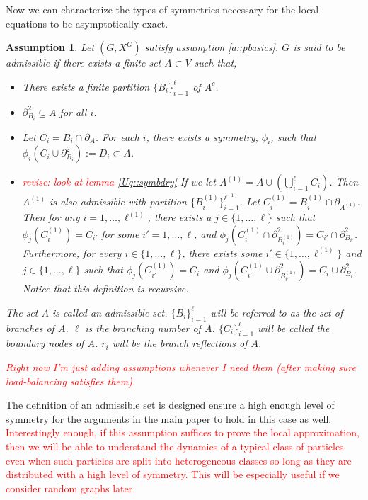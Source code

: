 \documentclass[12pt]{article}
\newcommand{\tr}{\textcolor{red}}
\newcommand{\ind}{\hspace{24pt}}
\newcommand{\defeq}{:=}								%
\newcommand{\neigh}[1]{\partial_{#1}}				%
\newcommand{\dneigh}[1]{\partial^2_{#1}}			%
\newcommand{\Xf}{X}									%
\newcommand{\gind}[1]{^{#1}}						%
\newcommand{\psize}{\ell}							%
\newtheorem{assu}[thms]{Assumption}
\begin{document}
Now we can characterize the types of symmetries necessary for the local equations to be asymptotically exact.

\begin{assu}
Let \((G,\Xf\gind{G})\) satisfy assumption \ref{a::pbasics}. \(G\) is said to be admissible if there exists a finite set \(A \subset V\) such that,

\begin{itemize}
\item There exists a finite partition \(\{B_i\}_{i=1}^\psize\) of \(A^c\).

\item \(\dneigh{B_i} \subseteq A\) for all \(i\).

\item Let \(C_i = B_i\cap\neigh{A}\). For each \(i\), there exists a symmetry, \(\phi_i\), such that \(\phi_i(C_i\cup \dneigh{B_i})\defeq D_i \subset A\).

\item \tr{revise: look at lemma \ref{Uq::symbdry}} If we let \(A^{(1)} = A\cup \left(\bigcup_{i=1}^\psize C_i\right)\). Then \(A^{(1)}\) is also admissible with partition \(\{B^{(1)}_i\}_{i=1}^{\psize^{(1)}}\). Let \(C^{(1)}_i = B^{(1)}_i\cap \neigh{A^{(1)}}\). Then for any \(i = 1,\dots,\psize^{(1)}\), there exists a \(j \in \{1,\dots,\psize\}\) such that \(\phi_j(C^{(1)}_i)= C_{i'}\) for some \(i' = 1,\dots,\psize\), and \(\phi_j(C^{(1)}_i\cap \dneigh{B^{(1)}_i}) = C_{i'}\cap \dneigh{B_{i'}}\). Furthermore, for every \(i \in \{1,\dots,\psize\}\), there exists some \(i' \in \{1,\dots,\psize^{(1)}\}\) and \(j \in \{1,\dots,\psize\}\) such that \(\phi_j(C_{i'}^{(1)}) = C_i\) and \(\phi_j(C_{i'}^{(1)}\cup\dneigh{B^{(1)}_{i'}}) = C_i\cup\dneigh{B_i}\). Notice that this definition is recursive.

\end{itemize}

The set \(A\) is called an admissible set. \(\{B_i\}_{i=1}^\psize\) will be referred to as the set of branches of \(A\). \(\psize\) is the branching number of \(A\). \(\{C_i\}_{i=1}^\psize\) will be called the boundary nodes of \(A\). \(r_i\) will be the branch reflections of \(A\).

\ind \tr{Right now I'm just adding assumptions whenever I need them (after making sure load-balancing satisfies them).}
\label{a::admissible}
\end{assu}

The definition of an admissible set is designed ensure a high enough level of symmetry for the arguments in the main paper to hold in this case as well. \tr{Interestingly enough, if this assumption suffices to prove the local approximation, then we will be able to understand the dynamics of a typical class of particles even when such particles are split into heterogeneous classes so long as they are distributed with a high level of symmetry. This will be especially useful if we consider random graphs later.}
\end{document}
